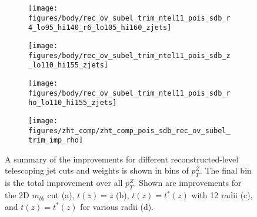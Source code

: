 \begin{figure}[!htbp]\captionsetup{justification=centering}
\begin{center}
\begin{subfigure}[t]{16pc}\centering\texttt{[image: figures/body/rec\_ov\_subel\_trim\_ntel11\_pois\_sdb\_r4\_lo95\_hi140\_r6\_lo105\_hi160\_zjets]}\caption{}\end{subfigure}
\begin{subfigure}[t]{16pc}\centering\texttt{[image: figures/body/rec\_ov\_subel\_trim\_ntel11\_pois\_sdb\_z\_lo110\_hi155\_zjets]}\caption{}\end{subfigure}
\begin{subfigure}[t]{16pc}\centering\texttt{[image: figures/body/rec\_ov\_subel\_trim\_ntel11\_pois\_sdb\_rho\_lo110\_hi155\_zjets]}\caption{}\end{subfigure}
\begin{subfigure}[t]{16pc}\centering\texttt{[image: figures/zht\_comp/zht\_comp\_pois\_sdb\_rec\_ov\_subel\_trim\_imp\_rho]}\caption{}\end{subfigure}
\caption{\label{fig:sigsumrec}A summary of the improvements for different reconstructed-level telescoping jet cuts and weights is shown in bins of $p_T^Z$.%
  The final bin is the total improvement over all $p_T^Z$.  Shown are improvements for the 2D $m_{bb}$ cut (a), $t\left(z\right)=z$ (b), $t\left(z\right)=t^*\left(z\right)$ with 12 radii (c), and $t\left(z\right)=t^*\left(z\right)$ for various radii (d).}
\end{center}
\end{figure}

